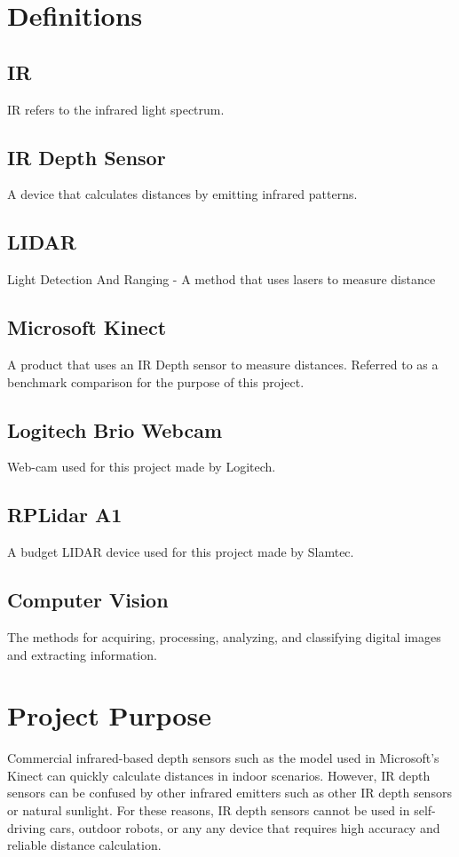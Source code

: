 \documentclass[onecolumn, draftclsnofoot,10pt, compsoc]{IEEEtran}
\begin{document}
\begin{singlespace}
	\section{Definitions}
		\subsection{IR}\label{def:IR}
		IR refers to the infrared light spectrum.

		\subsection{IR Depth Sensor}\label{def:depthsensor}
		A device that calculates distances by emitting infrared patterns. 
		
		\subsection{LIDAR}\label{def:lidar}
		Light Detection And Ranging - A method that uses lasers to measure distance
		
		\subsection{Microsoft Kinect}\label{def:kinect}
		A product that uses an IR Depth sensor to measure distances.
		Referred to as a benchmark comparison for the purpose of this project.
		
		\subsection{Logitech Brio Webcam}\label{def:brio}
		Web-cam used for this project made by Logitech. \cite{logitech}
		
		\subsection{RPLidar A1}\label{def:rplidar}
		A budget LIDAR device used for this project made by Slamtec. \cite{slamtec}

		
		\subsection{Computer Vision }\label{def:vision}
		The methods for acquiring, processing, analyzing, and classifying digital images and extracting information.
		
		
	\section{Project Purpose}
		Commercial infrared-based depth sensors such as the model used in Microsoft's Kinect can quickly calculate distances in indoor scenarios.
		However, IR depth sensors can be confused by other infrared emitters such as other IR depth sensors or natural sunlight.
		For these reasons, IR depth sensors cannot be used in self-driving cars, outdoor robots, or any any device that requires high accuracy and reliable distance calculation.



\end{singlespace}
\end{document}
